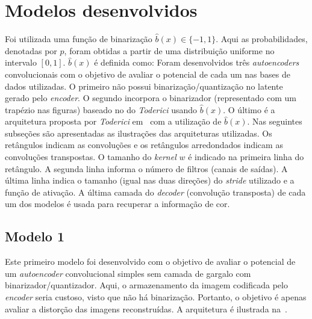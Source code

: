 \section{Modelos desenvolvidos}
Foi utilizada uma função de binarização $\hat{b}(x) \in \{-1, 1\}$. Aqui as probabilidades, denotadas por $p$, foram obtidas a partir de uma distribuição uniforme no intervalo $[0, 1]$. $\hat{b}(x)$ é definida como: 
Foram desenvolvidos três \textit{autoencoders} convolucionais com o objetivo de avaliar o potencial de cada um nas bases de dados utilizadas. O primeiro não possui binarização/quantização no latente gerado pelo \textit{encoder}. O segundo incorpora o binarizador (representado com um trapézio nas figuras) baseado no do \textit{Toderici} usando $\hat{b}(x)$. O último é a arquitetura proposta por \textit{Toderici} em~\cite{toderici2015variable} com a utilização de $\hat{b}(x)$. Nas seguintes subseções são apresentadas as ilustrações das arquiteturas utilizadas. Os retângulos indicam as convoluções e os retângulos arredondados indicam as convoluções transpostas. O tamanho do \textit{kernel} $w$ é indicado na primeira linha do retângulo. A segunda linha informa o número de filtros (canais de saídas). A última linha indica o tamanho (igual nas duas direções) do \textit{stride} utilizado e a função de ativação. A última camada do \textit{decoder} (convolução transposta) de cada um dos modelos é usada para recuperar a informação de cor.
\subsection{Modelo 1}
\label{cap3:mod1}
Este primeiro modelo foi desenvolvido com o objetivo de avaliar o potencial de um \textit{autoencoder} convolucional simples sem camada de gargalo com binarizador/quantizador. Aqui, o armazenamento da imagem codificada pelo \textit{encoder} seria custoso, visto que não há binarização. Portanto, o objetivo é apenas avaliar a distorção das imagens reconstruídas. A arquitetura é ilustrada na~.
